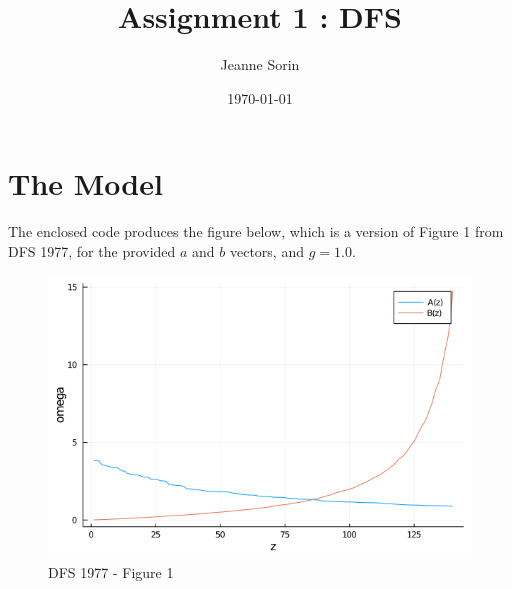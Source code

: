 \documentclass[10pt, final]{article}
\title{Assignment 1 : DFS}
\author{Jeanne Sorin}
\date{\today}
\begin{document}
\maketitle

\section{The Model} %


The enclosed code produces the figure below, which is a version of Figure 1 from DFS 1977, for the provided $a$ and $b$ vectors, and $g=1.0$.
\begin{figure}[h!]
	\center
	\includegraphics[width=12cm]{Fig1}
	\caption{DFS 1977 - Figure 1}
\end{figure}
\end{document}
